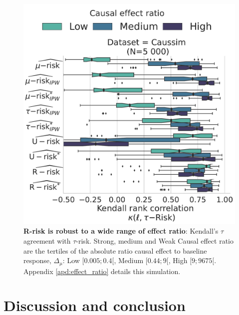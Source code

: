 \documentclass[a4paper,num-refs]{oup-contemporary}%
\begin{document}
\begin{figure}[!tb]
    \centering
    \begin{minipage}{\linewidth}
        \includegraphics[width=0.9\linewidth]{_6_effect_ratio_by_bin_comparaison_kendall_by_Dataset.pdf}
    \end{minipage}

    \caption{\textbf{R-risk is robust to a wide range of effect ratio}:
    Kendall's $\tau$ agreement with $\tau$-risk. Strong, medium and Weak Causal
    effect ratio are the tertiles of the absolute ratio causal effect to
    baseline response, $\Delta_{\mu}$: Low $[0.005;0.4[$, Medium $[0.44; 9[$,
    High $[9;9675[$. Appendix \ref{apd:effect_ratio} details this
    simulation.}\label{fig:effect_ratio_influence}
\end{figure}


\section{Discussion and conclusion}\label{sec:discussion}\label{sec:conclusion}
\end{document}
